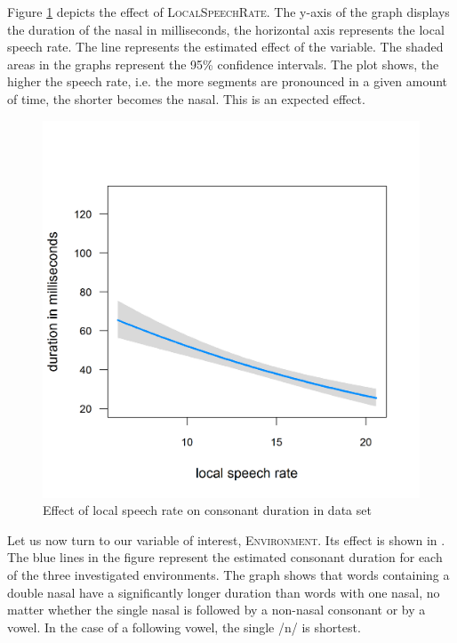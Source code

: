 Figure \ref{fig:SpeechRate un} depicts the effect of \textsc{LocalSpeechRate}.  The y-axis of the graph displays the duration of the nasal in milliseconds, the horizontal axis represents the local speech rate. The line represents the estimated effect of the variable. The shaded areas in the graphs represent the 95\% confidence intervals. The  plot shows, the higher the speech rate, i.e. the more segments are pronounced in a given amount of time, the shorter becomes the nasal. This is an expected effect.





\begin{figure} [t!]
	\centering

	\includegraphics [scale=0.4]{images/Corpus/unModelSpeechRate.png}
	\caption{ Effect of local speech rate on consonant duration in data set}
	\label{fig:SpeechRate un}

\end{figure}





Let us now turn to our variable of interest, \textsc{Environment}. Its effect is shown in . The blue lines in the figure represent the estimated consonant duration for each of the three investigated environments. The graph shows that words containing a double nasal have a significantly longer duration than words with one nasal, no matter whether the single nasal is followed by a non-nasal consonant or by a vowel. In the case of a following vowel, the single /n/ is shortest. 




